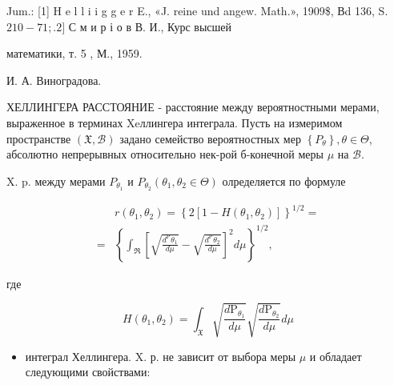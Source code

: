 \documentclass[10pt]{article}
\begin{document}
Jum.: [1] H e l l i i g g e r E., «J. reine und angew. Math.», 1909\$, Вd 136, S. $210-71 ; .2]$ С м и р і о в В. И., Курс высшей

математики, т. 5 , М., 1959.

И. А. Виноградова.



ХЕЛЛИНГЕРА РАССТОЯНИЕ - расстояние между вероятностными мерами, выраженное в терминах Xeллингера интеграла. Пусть на измеримом пространстве $(\mathfrak{X}, \mathscr{B})$ задано семейство вероятностных мер $\left\{P_{\theta}\right\}, \theta \in \Theta$, абсолютно непрерывных относительно нек-рой б-конечной меры $\mu$ на $\mathscr{B}$.



X. p. между мерами $P_{\theta_{1}}$ и $P_{\theta_{2}}\left(\theta_{1}, \theta_{2} \in \Theta\right)$ олределяется по формуле



\[

\begin{aligned}

& r\left(\theta_{1}, \theta_{2}\right)=\left\{2\left[1-H\left(\theta_{1}, \theta_{2}\right)\right]\right\}^{1 / 2}= \\

= & \left\{\int_{\Re}\left[\sqrt{\frac{d^{\mathrm{P}} \theta_{1}}{d \mu}}-\sqrt{\frac{d^{\mathrm{P}} \theta_{2}}{d \mu}}\right]^{2} d \mu\right\}^{1 / 2},

\end{aligned}

\]



где



\[

H\left(\theta_{1}, \theta_{2}\right)=\int_{\mathfrak{X}} \sqrt{\frac{d \mathrm{P}_{\theta_{1}}}{d \mu}} \sqrt{\frac{d \mathrm{P}_{\theta_{2}}}{d \mu}} d \mu

\]



\begin{itemize}

  \item интеграл Хеллингера. X. р. не зависит от выбора меры $\mu$ и обладает следующими свойствами:

\end{itemize}
\end{document}
